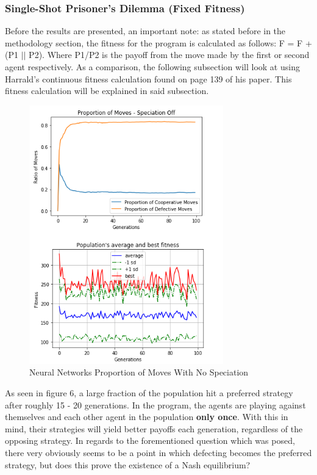 \documentclass[12pt,a4paper]{article}
\begin{document}
\subsubsection{Single-Shot Prisoner's Dilemma (Fixed Fitness)}

Before the results are presented, an important note: as stated before in the methodology section, the fitness for the program is calculated as follows: F = F + (P1 $||$  P2). Where P1/P2 is the payoff from the move made by the first or second agent respectively. As a comparison, the following subsection will look at using Harrald's continuous fitness calculation\cite{25} found on page 139 of his paper. This fitness calculation will be explained in said subsection.

\begin{figure}[H]
	\centering
		\includegraphics[width=0.75\textwidth]{RatioSpeciationOff}
		\caption{Neural Networks Proportion of Moves With No Speciation}
\end{figure}

As seen in figure 6, a large fraction of the population hit a preferred strategy after roughly 15 - 20 generations. In the program, the agents are playing against themselves and each other agent in the population \textbf{only once}. With this in mind, their strategies will yield better payoffs each generation, regardless of the opposing strategy. In regards to the forementioned question which was posed, there very obviously seems to be a point in which defecting becomes the preferred strategy, but does this prove the existence of a Nash equilibrium?
\end{document}
